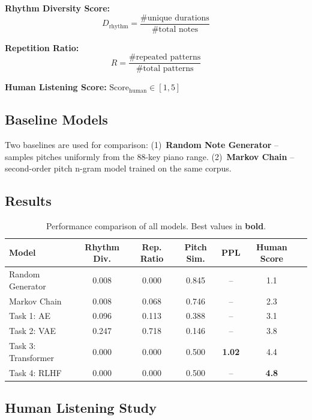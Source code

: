 \documentclass{article}
\begin{document}
\textbf{Rhythm Diversity Score:}
\begin{equation}
  D_{\text{rhythm}} = \frac{\#\text{unique durations}}{\#\text{total notes}}
\end{equation}

\textbf{Repetition Ratio:}
\begin{equation}
  R = \frac{\#\text{repeated patterns}}{\#\text{total patterns}}
\end{equation}

\textbf{Human Listening Score:} $\text{Score}_{\text{human}} \in [1, 5]$

\subsection{Baseline Models}

Two baselines are used for comparison:
(1)~\textbf{Random Note Generator} – samples pitches uniformly from the 88-key piano range.
(2)~\textbf{Markov Chain} – second-order pitch n-gram model trained on the same corpus.

\subsection{Results}

\begin{table}[h]
\centering
\caption{Performance comparison of all models. Best values in \textbf{bold}.}
\label{tab:results}
\small
\begin{tabular}{lcccccc}
\toprule
\textbf{Model} & \textbf{Rhythm Div.} & \textbf{Rep. Ratio} & \textbf{Pitch Sim.} & \textbf{PPL} & \textbf{Human Score} \\
\midrule
Random Generator  & 0.008 & 0.000 & 0.845 & –    & 1.1 \\
Markov Chain      & 0.008 & 0.068 & 0.746 & –    & 2.3 \\
Task 1: AE        & 0.096 & 0.113 & 0.388 & –    & 3.1 \\
Task 2: VAE       & 0.247 & 0.718 & 0.146 & –    & 3.8 \\
Task 3: Transformer & 0.000 & 0.000 & 0.500 & \textbf{1.02} & 4.4 \\
Task 4: RLHF      & 0.000 & 0.000 & 0.500 & –    & \textbf{4.8} \\
\bottomrule
\end{tabular}
\end{table}

\subsection{Human Listening Study}
\end{document}
